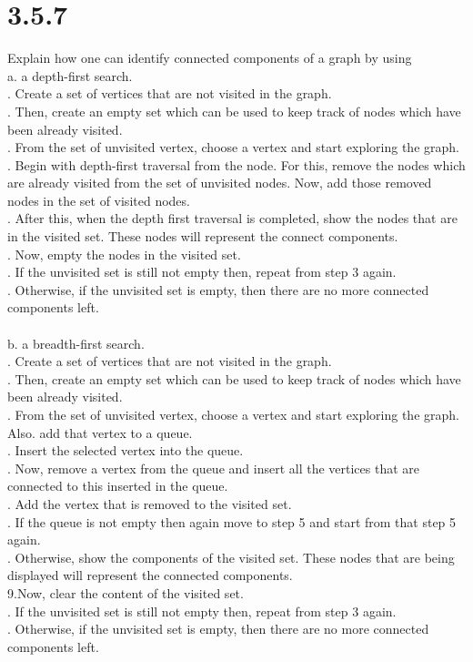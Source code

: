 \documentclass{article}
\begin{document}
\section{3.5.7}
Explain how one can identify connected components of a graph by using \\
a. a depth-first search. \\
. Create a set of vertices that are not visited in the graph. \\
. Then, create an empty set which can be used to keep track of nodes which have been already visited. \\
. From the set of unvisited vertex, choose a vertex and start exploring the graph. \\
. Begin with depth-first traversal from the node. For this, remove the nodes which are already visited from the set of unvisited nodes. Now, add those removed nodes in the set of visited nodes. \\
. After this, when the depth first traversal is completed, show the nodes that are in the visited set. These nodes will represent the connect components. \\
. Now, empty the nodes in the visited set. \\
. If the unvisited set is still not empty then, repeat from step 3 again. \\
. Otherwise, if the unvisited set is empty, then there are no more connected components left. \\ \\
b. a breadth-first search. \\
. Create a set of vertices that are not visited in the graph. \\
. Then, create an empty set which can be used to keep track of nodes which have been already visited. \\
. From the set of unvisited vertex, choose a vertex and start exploring the graph. \\
\indent \indent Also. add that vertex to a queue. \\
. Insert the selected vertex into the queue. \\
. Now, remove a vertex from the queue and insert all the vertices that are connected to this inserted in the queue. \\
. Add the vertex that is removed to the visited set. \\
. If the queue is not empty then again move to step 5 and start from that step 5 again. \\
. Otherwise, show the components of the visited set. These nodes that are being displayed will represent the connected components. \\
\indent 9.Now, clear the content of the visited set. \\
. If the unvisited set is still not empty then, repeat from step 3 again. \\
. Otherwise, if the unvisited set is empty, then there are no more connected components left.
\end{document}
